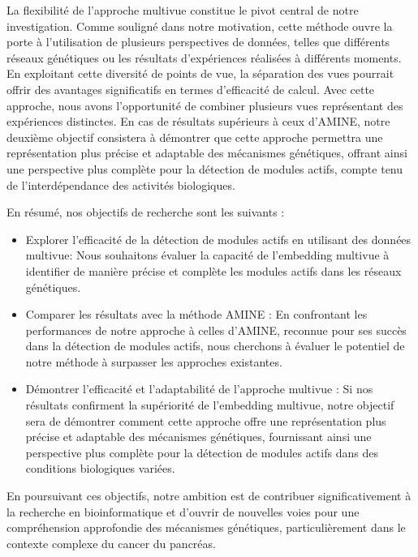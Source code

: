 La flexibilité de l'approche multivue constitue le pivot central de notre investigation. Comme souligné dans notre motivation, cette méthode ouvre la porte à l'utilisation de plusieurs perspectives de données, telles que différents réseaux génétiques ou les résultats d'expériences réalisées à différents moments. En exploitant cette diversité de points de vue, la séparation des vues pourrait offrir des avantages significatifs en termes d'efficacité de calcul. Avec cette approche, nous avons l'opportunité de combiner plusieurs vues représentant des expériences distinctes. En cas de résultats supérieurs à ceux d'AMINE, notre deuxième objectif consistera à démontrer que cette approche permettra une représentation plus précise et adaptable des mécanismes génétiques, offrant ainsi une perspective plus complète pour la détection de modules actifs, compte tenu de l'interdépendance des activités biologiques.

En résumé, nos objectifs de recherche sont les suivants :
\begin{itemize}

\item Explorer l'efficacité de la détection de modules actifs en utilisant des données multivue: Nous souhaitons évaluer la capacité de l'embedding multivue à identifier de manière précise et complète les modules actifs dans les réseaux génétiques.

\item Comparer les résultats avec la méthode AMINE : En confrontant les performances de notre approche à celles d'AMINE, reconnue pour ses succès dans la détection de modules actifs, nous cherchons à évaluer le potentiel de notre méthode à surpasser les approches existantes.

\item Démontrer l'efficacité et l'adaptabilité de l'approche multivue : Si nos résultats confirment la supériorité de l'embedding multivue, notre objectif sera de démontrer comment cette approche offre une représentation plus précise et adaptable des mécanismes génétiques, fournissant ainsi une perspective plus complète pour la détection de modules actifs dans des conditions biologiques variées.
\end{itemize}

En poursuivant ces objectifs, notre ambition est de contribuer significativement à la recherche en bioinformatique et d'ouvrir de nouvelles voies pour une compréhension approfondie des mécanismes génétiques, particulièrement dans le contexte complexe du cancer du pancréas.



